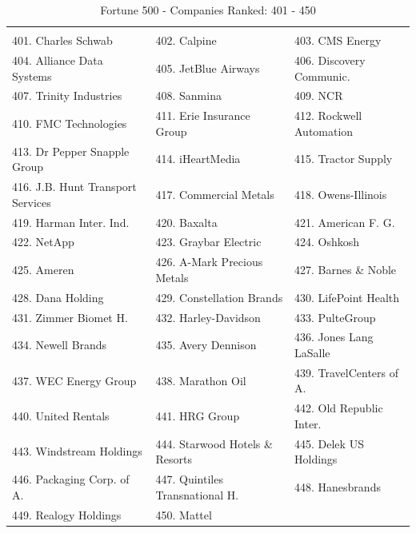 \documentclass{book}
\begin{document}
\begin{table}[H]
\centering
\caption{Fortune 500 - Companies Ranked: 401 - 450}
\begin{tabular}{lll}
\hline
 \\ 401. Charles Schwab 
&  402. Calpine 
&  403. CMS Energy 
\\ 404. Alliance Data Systems 
&  405. JetBlue Airways 
&  406. Discovery Communic.
\\ 407. Trinity Industries 
&  408. Sanmina 
&  409. NCR 
\\ 410. FMC Technologies 
&  411. Erie Insurance Group 
&  412. Rockwell Automation 
\\ 413. Dr Pepper Snapple Group 
&  414. iHeartMedia 
&  415. Tractor Supply 
\\ 416. J.B. Hunt Transport Services 
&  417. Commercial Metals 
&  418. Owens-Illinois 
\\ 419. Harman Inter. Ind.
&  420. Baxalta 
&  421. American F. G.
\\ 422. NetApp 
&  423. Graybar Electric 
&  424. Oshkosh 
\\ 425. Ameren 
&  426. A-Mark Precious Metals 
&  427. Barnes \& Noble 
\\ 428. Dana Holding 
&  429. Constellation Brands 
&  430. LifePoint Health 
\\ 431. Zimmer Biomet H. 
&  432. Harley-Davidson 
&  433. PulteGroup 
\\ 434. Newell Brands 
&  435. Avery Dennison 
&  436. Jones Lang LaSalle 
\\ 437. WEC Energy Group 
&  438. Marathon Oil 
&  439. TravelCenters of A. 
\\ 440. United Rentals 
&  441. HRG Group 
&  442. Old Republic Inter. 
\\ 443. Windstream Holdings 
&  444. Starwood Hotels \& Resorts 
&  445. Delek US Holdings 
\\ 446. Packaging Corp. of A.
&  447. Quintiles Transnational H. 
&  448. Hanesbrands 
\\ 449. Realogy Holdings 
&  450. Mattel 
&   
 \\ \hline

\end{tabular}
\end{table}
\end{document}
